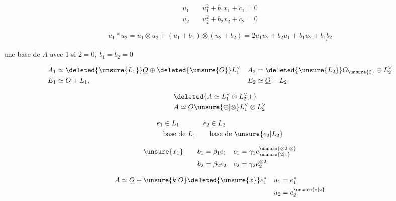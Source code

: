 
\[
\begin{aligned}
u_1&\quad u_1^2+b_1 x_1+c_1=0\\
u_2&\quad u_2^2+b_2x_2+c_2=0
\end{aligned}
\]

\[ u_1*u_2=u_1\otimes u_2+(u_1+b_1)\otimes(u_2+b_2)=2u_1u_2+b_2u_1+b_1u_2+\underline{\underline{b_1b_2}} \]

   une base de $A$ avec $1$  si $2=0$, $b_1=b_2=0$

\[
\begin{aligned}
A_1&\simeq\deleted{\unsure{L_1}}\underline O\oplus\deleted{\unsure{O}}L_1^\vee &
 A_2&=\deleted{\unsure{L_2}}O_{\unsure{2}}\oplus L_2^\vee\\
E_1&\simeq O+L_1, & E_2&\simeq\underline O+L_2
\end{aligned}
\]

\[
\begin{aligned}
&\deleted{A\simeq L_1^\vee\otimes L_2^\vee+}\\
&A\simeq\underline O\unsure{\oplus|\otimes} L_1^\vee\otimes L_2^\vee
\end{aligned}
\]


\[
\begin{aligned}
e_1&\in L_1 & e_2&\in L_2\\
&\text{base de }L_1 &&\text{base de }\unsure{e_2|L_2}
\end{aligned}
\]

\[
\begin{aligned}
\unsure{x_1}\qquad b_1&=\beta_1e_1 &c_1&=\gamma_1e_{\unsure{2|1}}^{\unsure{\otimes2|\otimes}}\\
b_2&=\beta_2e_2 &c_2&=\gamma_2 e_2^{\otimes2}
\end{aligned}
\]

\[
\begin{aligned}
 A&\simeq\underline O+\unsure{k|O}\deleted{\unsure{x}}e_1^* &
 u_1&=e_1^*\\
 &&u_2&=e_2^{\unsure{*|\circ}}
\end{aligned}
\]

